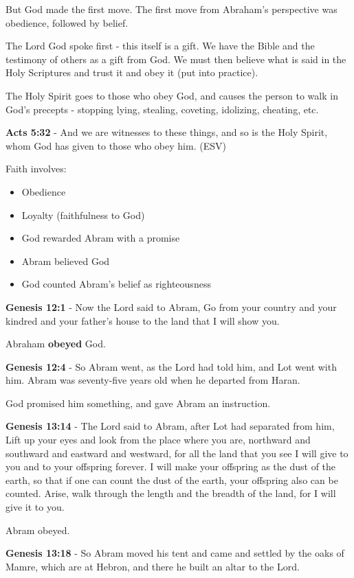 \documentclass[11pt]{article}
\begin{document}
But God made the first move.
The first move from Abraham's perspective was obedience, followed by belief.

The Lord God spoke first - this itself is a gift. We have the Bible and the testimony of others as a gift from God.
We must then believe what is said in the Holy Scriptures and trust it and obey it (put into practice).

The Holy Spirit goes to those who obey God, and causes the person to walk in God's precepts - stopping lying, stealing, coveting, idolizing, cheating, etc.

\textbf{Acts 5:32} - And we are witnesses to these things, and so is the Holy Spirit, whom God has given to those who obey him. (ESV)

Faith involves:
\begin{itemize}
\item Obedience
\item Loyalty (faithfulness to God)
\item God rewarded Abram with a promise
\item Abram believed God
\item God counted Abram's belief as righteousness
\end{itemize}

\textbf{Genesis 12:1} - Now the Lord said to Abram, Go from your country and your kindred and your father's house to the land that I will show you.

Abraham \textbf{obeyed} God.

\textbf{Genesis 12:4} - So Abram went, as the Lord had told him, and Lot went with him. Abram was seventy-five years old when he departed from Haran.

God promised him something, and gave Abram an instruction.

\textbf{Genesis 13:14} - The Lord said to Abram, after Lot had separated from him, Lift up your eyes and look from the place where you are, northward and southward and eastward and westward, for all the land that you see I will give to you and to your offspring forever.  I will make your offspring as the dust of the earth, so that if one can count the dust of the earth, your offspring also can be counted. Arise, walk through the length and the breadth of the land, for I will give it to you.

Abram obeyed.

\textbf{Genesis 13:18} - So Abram moved his tent and came and settled by the oaks of Mamre, which are at Hebron, and there he built an altar to the Lord.
\end{document}
